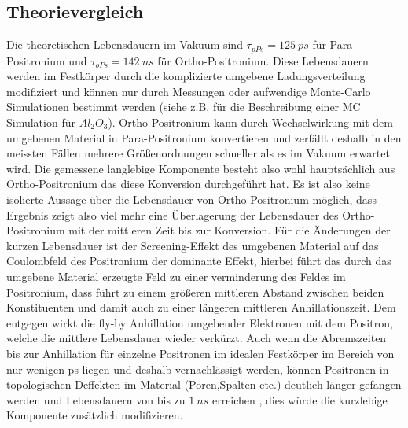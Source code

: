 \documentclass[a4paper,12pt]{article}
\begin{document}
\subsection{Theorievergleich}
Die theoretischen Lebensdauern im Vakuum sind $\tau_{pPs} = \SI{125}{ps}$ für Para-Positronium und $\tau_{oPs} = \SI{142}{ns}$ für Ortho-Positronium. Diese Lebensdauern werden
im Festkörper durch die komplizierte umgebene Ladungsverteilung modifiziert und können nur durch Messungen oder aufwendige Monte-Carlo Simulationen bestimmt werden 
(siehe z.B. \cite{phd_trezzi} für die Beschreibung einer MC Simulation für $Al_{2}O_{3}$). Ortho-Positronium kann durch Wechselwirkung mit dem umgebenen Material in Para-Positronium konvertieren
und zerfällt deshalb in den meissten Fällen mehrere Größenordnungen schneller als es im Vakuum erwartet wird. Die gemessene langlebige Komponente besteht also wohl hauptsächlich aus
Ortho-Positronium das diese Konversion durchgeführt hat. Es ist also keine isolierte Aussage über die Lebensdauer von Ortho-Positronium möglich, dass Ergebnis zeigt also viel mehr eine 
Überlagerung der Lebensdauer des Ortho-Positronium mit der mittleren Zeit bis zur Konversion. Für die Änderungen der kurzen Lebensdauer ist der Screening-Effekt des umgebenen Material auf 
das Coulombfeld des Positronium der dominante Effekt, hierbei führt das durch das umgebene Material erzeugte Feld zu einer verminderung des Feldes im Positronium, dass führt zu einem 
größeren mittleren Abstand zwischen beiden Konstituenten und damit auch zu einer längeren mittleren Anhillationszeit. Dem entgegen wirkt die fly-by Anhillation umgebender Elektronen mit
dem Positron, welche die mittlere Lebensdauer wieder verkürzt. Auch wenn die Abremszeiten bis zur Anhillation für einzelne Positronen im idealen Festkörper im Bereich von nur wenigen 
ps liegen und deshalb vernachlässigt werden, können Positronen in topologischen Deffekten im Material (Poren,Spalten etc.) deutlich länger gefangen werden und Lebensdauern von bis zu $ \SI{1}{ns}$
erreichen \cite{theory2}, dies würde die kurzlebige Komponente zusätzlich modifizieren.



{}
\end{document}
